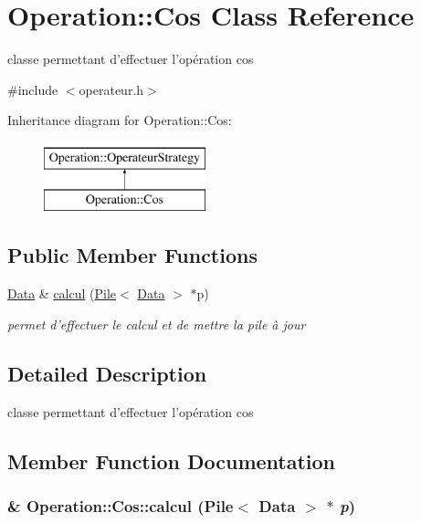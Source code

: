 \hypertarget{classOperation_1_1Cos}{
\section{Operation::Cos Class Reference}
\label{classOperation_1_1Cos}
}


classe permettant d'effectuer l'opération cos  




{\ttfamily \#include $<$operateur.h$>$}

Inheritance diagram for Operation::Cos:\begin{figure}[H]
\begin{center}
\leavevmode
\includegraphics[height=2cm]{classOperation_1_1Cos}
\end{center}
\end{figure}
\subsection*{Public Member Functions}
\begin{DoxyCompactItemize}
\item 
\hyperlink{classNombre_1_1Data}{Data} \& \hyperlink{classOperation_1_1Cos_af1732358f2efad5b99a40732665b7bb7}{calcul} (\hyperlink{classPile}{Pile}$<$ \hyperlink{classNombre_1_1Data}{Data} $>$ $\ast$p)
\begin{DoxyCompactList}\small\item\em permet d'effectuer le calcul et de mettre la pile à jour \item\end{DoxyCompactList}\end{DoxyCompactItemize}


\subsection{Detailed Description}
classe permettant d'effectuer l'opération cos 

\subsection{Member Function Documentation}
\hypertarget{classOperation_1_1Cos_af1732358f2efad5b99a40732665b7bb7}{
\subsubsection[{calcul}]{\& Operation::Cos::calcul ({\bf Pile}$<$ {\bf Data} $>$ $\ast$ {\em p})}}
\label{classOperation_1_1Cos_af1732358f2efad5b99a40732665b7bb7}


